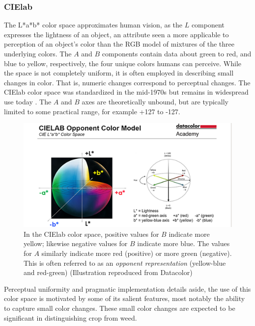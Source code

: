 \documentclass[letterpaper]{report}
\begin{document}
\subsubsection{CIElab}
The L*a*b* color space approximates human vision, as the $L$ component expresses  the lightness of an object, an attribute seen a more applicable to perception of an object's color than the RGB model of mixtures of the three underlying colors.  The $A$ and $B$ components contain data about green to red, and blue to yellow, respectively, the four unique colors humans can perceive. While the space is not completely uniform, it is often employed in describing small changes in color. That is, numeric changes correspond to perceptual changes. The CIElab color space was standardized in the mid-1970s but remains in widespread use today \cite{Leilich2023-lf}.  The $A$ and $B$ axes are theoretically unbound, but are typically limited to some practical range, for example +127 to -127. 

\begin{figure}[H]
	\centering
	\includegraphics[width=.65\linewidth]{./figures/cielab-colorspace.png}
	\caption[CIElab color space]{In the CIElab color space, positive values for $B$ indicate more yellow; likewise negative values for $B$ indicate more blue. The values for $A$ similarly indicate more red (positive) or more green (negative). This is often referred to as an \textit{opponent representation} (yellow-blue and red-green) (Illustration reproduced from Datacolor)}
	\label{fig:cielab}	
\end{figure}

Perceptual uniformity and pragmatic implementation details aside, the use of this color space is motivated by some of its salient features, most notably the ability to capture small color changes. These small color changes are expected to be significant in distinguishing crop from weed.
\end{document}
